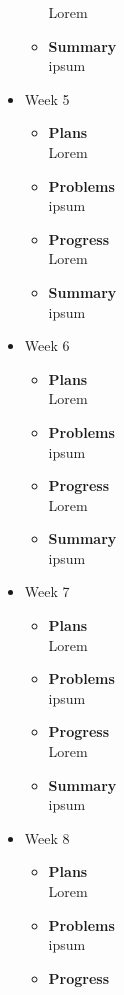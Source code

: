 \begin{itemize}
\begin{itemize}
				Lorem
				\item \textbf{Summary} \\
				ipsum
			\end{itemize}
		\item{Week 5}
			\begin{itemize}
				\item \textbf{Plans} \\
				Lorem
				\item \textbf{Problems} \\
				ipsum
				\item \textbf{Progress} \\
				Lorem
				\item \textbf{Summary} \\
				ipsum
			\end{itemize}
		\item{Week 6}
			\begin{itemize}
				\item \textbf{Plans} \\
				Lorem
				\item \textbf{Problems} \\
				ipsum
				\item \textbf{Progress} \\
				Lorem
				\item \textbf{Summary} \\
				ipsum
			\end{itemize}
		\item{Week 7}
			\begin{itemize}
				\item \textbf{Plans} \\
				Lorem
				\item \textbf{Problems} \\
				ipsum
				\item \textbf{Progress} \\
				Lorem
				\item \textbf{Summary} \\
				ipsum
			\end{itemize}
		\item{Week 8}
			\begin{itemize}
				\item \textbf{Plans} \\
				Lorem
				\item \textbf{Problems} \\
				ipsum
				\item \textbf{Progress} \\

\end{itemize}
\end{itemize}
